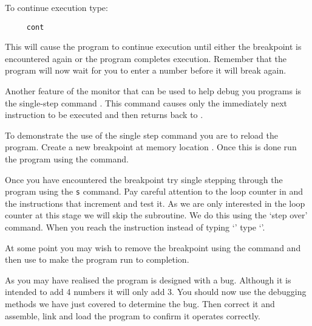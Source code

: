 To continue execution type:
\begin{verbatim}
     cont
\end{verbatim}
This will cause the program to continue execution until either the
breakpoint is encountered again or the program completes
execution. Remember that the program will now wait for you to enter a
number before it will break again.

Another feature of the monitor that can be used to help debug you programs 
is the single-step command .
This command causes only the immediately next instruction 
to be executed and then returns back to
\WRAMPmon.

To demonstrate the use of the single step command you are to reload
the program.  Create a new breakpoint at memory location
. Once this is done run the program using the 
command.

Once you have encountered the breakpoint try single stepping through
the program using the \verb|s| command. Pay careful attention to the
loop counter in  and the instructions that increment and test
it. As we are only interested in the loop counter at this stage we
will skip the  subroutine.  We do this using the `step
over'  command.  When you reach the instruction  instead of typing `' type `'.

At some point you may wish to remove the breakpoint using the
 command and then use  to make the program run to
completion.

As you may have realised the program is designed with a bug.  Although
it is intended to add 4 numbers it will only add 3.  You should now use
the debugging methods we have just covered to determine the
bug.  Then correct it and assemble, link and load the program to confirm
it operates correctly.
